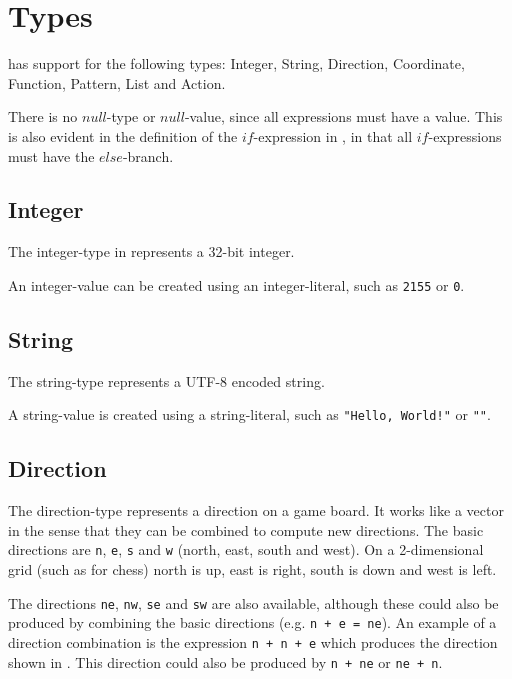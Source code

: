 \section{Types}
\label{sec:types}

\productname{} has support for the following types: Integer, String, Direction, Coordinate,
Function, Pattern, List and Action.

There is no $null$-type or $null$-value, since all expressions must have a value. This
is also evident in the definition of the $if$-expression in , in that
all $if$-expressions must have the $else$-branch.

\subsection{Integer}
The integer-type in \productname{} represents a 32-bit integer.

An integer-value can be created using an integer-literal, such as \texttt{2155} or \texttt{0}.

\subsection{String}
The string-type represents a UTF-8 encoded string.

A string-value is created using a string-literal, such as \texttt{"Hello, World!"} or \texttt{""}.

\subsection{Direction}
The direction-type represents a direction on a game board. It works like a vector
in the sense that they can be combined to compute new directions. The basic directions
are \texttt{n}, \texttt{e}, \texttt{s} and \texttt{w} (north, east, south and west).
On a 2-dimensional grid (such as for chess) north is up, east is right, south is down and 
west is left.

The directions \texttt{ne}, \texttt{nw},
\texttt{se} and \texttt{sw} are also available, although these could also be produced
by combining the basic directions (e.g. \texttt{n + e = ne}). An example of a direction combination is the
expression \texttt{n + n + e} which produces
the direction shown in . This direction could also be produced by
\texttt{n + ne} or \texttt{ne + n}.


